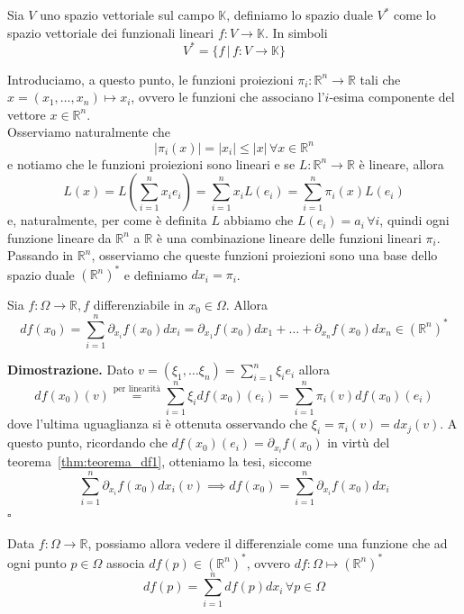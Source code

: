 \vspace{0.5cm}
\begin{definition}[\textcolor{blue}{spazio duale}]
Sia $V$ uno spazio vettoriale sul campo $\mathbb{K}$, definiamo lo spazio duale $V^{*}$ come lo spazio vettoriale dei funzionali lineari $f: V \to \mathbb{K}$. In simboli
$$
V^{*} = \{f \, | \, f: V \to \mathbb{K} \}
$$
\end{definition}

\noindent Introduciamo, a questo punto, le funzioni proiezioni $\pi_i: \mathbb{R}^n \to \mathbb{R}$ tali che $x = (x_1, \ldots, x_n) \mapsto x_i$, ovvero le funzioni che associano l'$i$-esima componente del vettore $x \in \mathbb{R}^n$. \\
Osserviamo naturalmente che
$$
|\pi_i(x)| = |x_i| \leq |x| \, \forall x \in \mathbb{R}^n
$$ 
e notiamo che le funzioni proiezioni sono lineari e se $L: \mathbb{R}^n \to \mathbb{R}$ è lineare, allora
$$
L(x) = L \left( \sum_{i=1}^n x_i e_i \right) = \sum_{i=1}^n x_i L(e_i) = \sum_{i=1}^n \pi_i(x) L(e_i)
$$
e, naturalmente, per come è definita $L$ abbiamo che $L(e_i) = a_i \, \forall i$, quindi ogni funzione lineare da $\mathbb{R}^n$ a $\mathbb{R}$ è una combinazione lineare delle funzioni lineari $\pi_i$. \\
Passando in $\mathbb{R}^n$, osserviamo che queste funzioni proiezioni sono una base dello spazio duale $(\mathbb{R}^n)^{*}$ e definiamo $dx_i = \pi_i$. \\

\vspace{0.5cm}
\begin{prop}
Sia $f: \Omega \to \mathbb{R}, f$ differenziabile in $x_0 \in \Omega$. Allora
$$
df(x_0) = \sum_{i=1}^n \partial_{x_i} f(x_0)dx_i = \partial_{x_1} f(x_0)dx_1 + \ldots + \partial_{x_n} f(x_0)dx_n \in (\mathbb{R}^n)^{*}
$$
\end{prop}

\noindent \textbf{Dimostrazione. }
Dato $v=(\xi_1, \ldots \xi_n) = \sum_{i=1}^n \xi_i e_i$ allora
$$
df(x_0)(v) \stackrel{\text{per linearità}}{=} \sum_{i=1}^n \xi_i df(x_0)(e_i) = \sum_{i=1}^n \pi_i(v) df(x_0)(e_i)$$
dove l'ultima uguaglianza si è ottenuta osservando che $\xi_i = \pi_i(v) = dx_j(v)$. A questo punto, ricordando che $df(x_0)(e_i) = \partial_{x_i} f(x_0)$ in virtù del teorema~\ref{thm:teorema_df1}, otteniamo la tesi, siccome
$$\sum_{i=1}^n \partial_{x_i} f(x_0) dx_i(v) \implies df(x_0) = \sum_{i=1}^n \partial_{x_i} f(x_0) dx_i
$$
\hfill $\square$

\begin{remark}
Data $f: \Omega \to \mathbb{R}$, possiamo allora vedere il differenziale come una funzione che ad ogni punto $p \in \Omega$ associa $df(p) \in (\mathbb{R}^n)^{*}$, ovvero $df: \Omega \mapsto (\mathbb{R}^n)^{*}$
$$
df(p) = \sum_{i=1}^n df(p)dx_i \, \forall p \in \Omega
$$
\end{remark}

